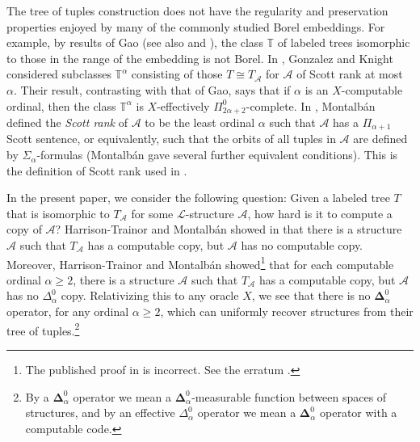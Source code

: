 \documentclass{article}
\newcommand{\bfDelta}{\boldsymbol{\Delta}}
\theoremstyle{definition}
\begin{document}
	The tree of tuples construction does not have the regularity and preservation properties enjoyed by many of the commonly studied Borel embeddings. For example, by results of Gao \cite{Gao} (see also \cite{GonzalezRossegger} and \cite{HTKim}), the class $\mathbb{T}$ of labeled trees isomorphic to those in the range of the embedding is not Borel. In \cite{GonzalezKnight}, Gonzalez and Knight considered subclasses $\mathbb{T}^\alpha$ consisting of those $T\cong T_\mathcal{A}$ for $\mathcal{A}$ of Scott rank at most $\alpha$. Their result, contrasting with that of Gao, says that if $\alpha$ is an $X$-computable ordinal, then the class $\mathbb{T}^\alpha$ is $X$-effectively $\Pi^0_{2\alpha+2}$-complete. In \cite{robuster}, Montalb\'{a}n defined the \emph{Scott rank} of $\mathcal{A}$ to be the least ordinal $\alpha$ such that $\mathcal{A}$ has a $\Pi_{\alpha+1}$ Scott sentence, or equivalently, such that the orbits of all tuples in $\mathcal{A}$ are defined by $\Sigma_\alpha$-formulas (Montalb\'{a}n gave several further equivalent conditions).  This is the definition of Scott rank used in \cite{GonzalezKnight}. 
	
	In the present paper, we consider the following question: Given a labeled tree $T$ that is isomorphic to $T_{\mathcal{A}}$ for some $\mathcal{L}$-structure $\mathcal{A}$, how hard is it to compute a copy of $\mathcal{A}$? Harrison-Trainor and Montalb\'an showed in \cite{HTMontalban} that there is a structure $\mathcal{A}$ such that $T_\mathcal{A}$ has a computable copy, but $\mathcal{A}$ has no computable copy. Moreover, Harrison-Trainor and Montalb\'an showed\footnote{The published proof in 
		\cite{HTMontalban} is incorrect. See the erratum \cite{errata}.} that for each computable ordinal $\alpha\geq 2$, there is a structure $\mathcal{A}$ such that $T_\mathcal{A}$ has a computable copy, but $\mathcal{A}$ has no $\Delta^0_\alpha$ copy. Relativizing this to any oracle $X$, we see that there is no $\bfDelta^0_\alpha$ operator, for any ordinal $\alpha\geq 2$, which can uniformly recover structures from their tree of tuples.\footnote{By a $\bfDelta^0_\alpha$ operator we mean a $\bfDelta^0_\alpha$-measurable function between spaces of structures, and by an effective $\Delta^0_\alpha$ operator we mean a $\bfDelta^0_\alpha$ operator with a computable code.}
	
\end{document}

